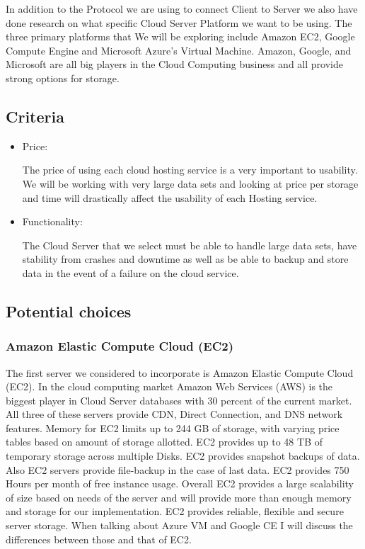 In addition to the Protocol we are using to connect Client to Server we also have done research on what specific Cloud Server Platform we want to be using. The three primary platforms that We will be exploring include Amazon EC2, Google Compute Engine and Microsoft Azure’s Virtual Machine. Amazon, Google, and Microsoft are all big players in the Cloud Computing business and all provide strong options for storage.
\subsection{ Criteria }

\begin{itemize}
  \item Price:

The price of using each cloud hosting service is a very important to usability. We will be working with very large data sets and looking at price per storage and time will drastically affect the usability of each Hosting service.

  \item Functionality:

 The Cloud Server that we select must be able to handle large data sets, have stability from crashes and downtime as well as be able to backup and store data in the event of a failure on the cloud service.

\end{itemize}

\subsection{ Potential choices }
\subsubsection{ Amazon Elastic Compute Cloud (EC2)}

The first server we considered to incorporate is Amazon Elastic Compute Cloud (EC2). In the cloud computing market Amazon Web Services (AWS) is the biggest player in Cloud Server databases with 30 percent of the current market. All three of these servers provide CDN, Direct Connection, and DNS network features. Memory for EC2 limits up to 244 GB of storage, with varying price tables based on amount of storage allotted. EC2 provides up to 48 TB of temporary storage across multiple Disks. EC2 provides snapshot backups of data. Also EC2 servers provide file-backup in the case of last data. EC2 provides 750 Hours per month of free instance usage. Overall  EC2 provides a large scalability of size based on needs of the server and will provide more than enough memory and storage for our implementation. EC2 provides reliable, flexible and secure server storage. When talking about Azure VM and Google CE I will discuss the differences between those and that of EC2.
